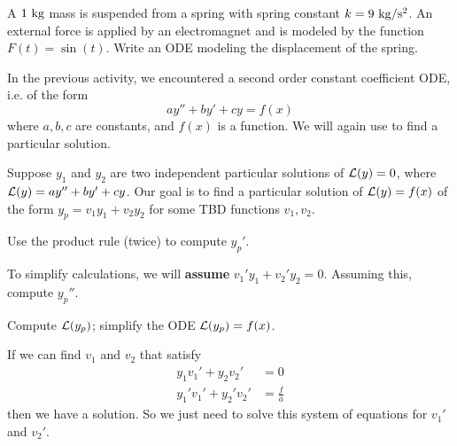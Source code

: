 
\begin{applicationActivities}


\begin{activity}{10}
A \(1\ {\rm kg}\) mass is suspended from a spring with spring constant \(k= 9\ {\rm kg/s^2}\).  An external force is applied by an electromagnet and is modeled by the function \(F(t)=\sin(t)\).  Write an ODE modeling the displacement of the spring.
\end{activity}

\begin{observation}
In the previous activity, we encountered a  second order constant coefficient ODE, i.e. of the form
\[ay''+by'+cy=f(x)\]
where \(a,b,c\) are constants, and \(f(x)\) is a function.
\vfill
We will again use  to find a particular solution.
\vfill
\end{observation}

\begin{activity}{15}
Suppose \(y_1\) and \(y_2\) are two independent particular solutions of \(\mathcal{L}(y)=0\), where \(\mathcal{L}(y)=ay''+by'+cy\).  
\vfill
Our goal is to find a particular solution of \(\mathcal{L}(y)=f(x)\) of the form \(y_p = v_1 y_1 + v_2 y_2\) for some TBD functions \(v_1,v_2\).
\vfill
\begin{subactivity}
Use the product rule (twice) to compute \(y_p'\).
\end{subactivity}

\begin{subactivity} To simplify calculations, we will \textbf{assume} \(v_1'y_1+v_2'y_2=0\).  Assuming this, compute \(y_p''\).
\end{subactivity}

\begin{subactivity}
Compute \(\mathcal{L}(y_p)\); simplify the ODE \(\mathcal{L}(y_p)=f(x)\).
\end{subactivity}
\vfill
\end{activity}

\begin{observation}
If we can find \(v_1\) and \(v_2\) that satisfy
\begin{alignat*}{2}
y_1 v_1' + y_2 v_2'&=0 \\
y_1' v_1' + y_2' v_2'&=\frac{f}{a} 
\end{alignat*}
then we have a solution.  So we just need to solve this system of equations for \(v_1'\) and \(v_2'\).


\end{observation}
\end{applicationActivities}
